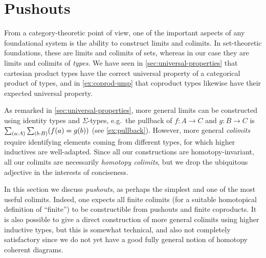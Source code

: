 %
%

\section{Pushouts}
\label{sec:colimits}

%
%
%
%
From a category-theoretic point of view, one of the important aspects of any foundational system is the ability to construct limits and colimits.
In set-theoretic foundations, these are limits and colimits of sets, whereas in our case they are limits and colimits of \emph{types}.
We have seen in \autoref{sec:universal-properties} that cartesian product types have the correct universal property of a categorical product of types, and in \autoref{ex:coprod-ump} that coproduct types likewise have their expected universal property.

As remarked in \autoref{sec:universal-properties}, more general limits can be constructed using identity types and $\Sigma$-types, e.g.\ the pullback of $f:A\to C$ and $g:B\to C$ is $\sm{a:A}{b:B} (f(a)=g(b))$ (see \autoref{ex:pullback}).
However, more general \emph{colimits} require identifying elements coming from different types, for which higher inductives are well-adapted.
Since all our constructions are homotopy-invariant, all our colimits are necessarily \emph{homotopy colimits}, but we drop the ubiquitous adjective in the interests of conciseness.

In this section we discuss \emph{pushouts}, as perhaps the simplest and one of the most useful colimits.
Indeed, one expects all finite colimits (for a suitable homotopical definition of ``finite'') to be constructible from pushouts and finite coproducts.
It is also possible to give a direct construction of more general colimits using higher inductive types, but this is somewhat technical, and also not completely satisfactory since we do not yet have a good fully general notion of homotopy coherent diagrams.

